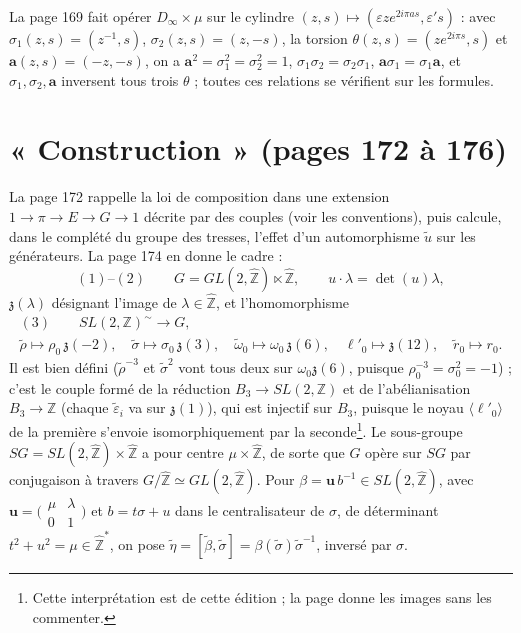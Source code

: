 \documentclass[11pt,a4paper]{article}
\begin{document}
La page 169 fait opérer $D_\infty \times \mu$ sur le cylindre
$(z, s) \mapsto (\varepsilon z e^{2i\pi as}, \varepsilon' s)$ : avec
$\sigma_1(z, s) = (z^{-1}, s)$, $\sigma_2(z, s) = (z, -s)$, la torsion
$\theta(z, s) = (z e^{2i\pi s}, s)$ et $\mathbf{a}(z, s) = (-z, -s)$, on a
$\mathbf{a}^2 = \sigma_1^2 = \sigma_2^2 = 1$, $\sigma_1\sigma_2 = \sigma_2\sigma_1$,
$\mathbf{a}\sigma_1 = \sigma_1\mathbf{a}$, et $\sigma_1, \sigma_2, \mathbf{a}$
inversent tous trois $\theta$ ; toutes ces relations se vérifient sur les
formules.

\section*{« Construction » (pages 172 à 176)}

La page 172 rappelle la loi de composition dans une extension
$1 \to \pi \to E \to G \to 1$ décrite par des couples (voir les conventions),
puis calcule, dans le complété du groupe des tresses, l'effet d'un
automorphisme $\tilde u$ sur les générateurs. La page 174 en donne le cadre :
\[
(1)\text{--}(2)\qquad G = GL(2, \widehat{\mathbb{Z}}) \ltimes \widehat{\mathbb{Z}}, \qquad u \cdot \lambda = \det(u)\lambda,
\]
$\mathfrak{z}(\lambda)$ désignant l'image de $\lambda \in \widehat{\mathbb{Z}}$, et
l'homomorphisme
\[
\begin{gathered}
(3)\qquad SL(2, \mathbb{Z})^{\sim} \to G, \\
\tilde\rho \mapsto \rho_0\,\mathfrak{z}(-2), \quad \tilde\sigma \mapsto \sigma_0\,\mathfrak{z}(3), \quad
\tilde\omega_0 \mapsto \omega_0\,\mathfrak{z}(6), \quad \ell'_0 \mapsto \mathfrak{z}(12), \quad \tilde r_0 \mapsto r_0 .
\end{gathered}
\]
Il est bien défini ($\tilde\rho^{-3}$ et $\tilde\sigma^2$ vont tous deux sur
$\omega_0\mathfrak{z}(6)$, puisque $\rho_0^{-3} = \sigma_0^2 = -1$) ; c'est le
couple formé de la réduction $B_3 \to SL(2, \mathbb{Z})$ et de l'abélianisation
$B_3 \to \mathbb{Z}$ (chaque $\tilde\varepsilon_i$ va sur $\mathfrak{z}(1)$), qui
est injectif sur $B_3$, puisque le noyau $\langle \ell'_0 \rangle$ de la première
s'envoie isomorphiquement par la seconde\footnote{Cette interprétation est de
cette édition ; la page donne les images sans les commenter.}. Le sous-groupe
$SG = SL(2, \widehat{\mathbb{Z}}) \times \widehat{\mathbb{Z}}$ a pour centre
$\mu \times \widehat{\mathbb{Z}}$, de sorte que $G$ opère sur $SG$ par
conjugaison à travers $G/\widehat{\mathbb{Z}} \simeq GL(2, \widehat{\mathbb{Z}})$.
Pour $\beta = \mathbf{u}\, b^{-1} \in SL(2, \widehat{\mathbb{Z}})$, avec
$\mathbf{u} = \bigl(\begin{smallmatrix} \mu & \lambda \\ 0 & 1 \end{smallmatrix}\bigr)$
et $b = t\sigma + u$ dans le centralisateur de $\sigma$, de déterminant
$t^2 + u^2 = \mu \in \widehat{\mathbb{Z}}^*$, on pose
$\tilde\eta = [\tilde\beta, \tilde\sigma] = \beta(\tilde\sigma)\tilde\sigma^{-1}$,
inversé par $\sigma$.
\end{document}
